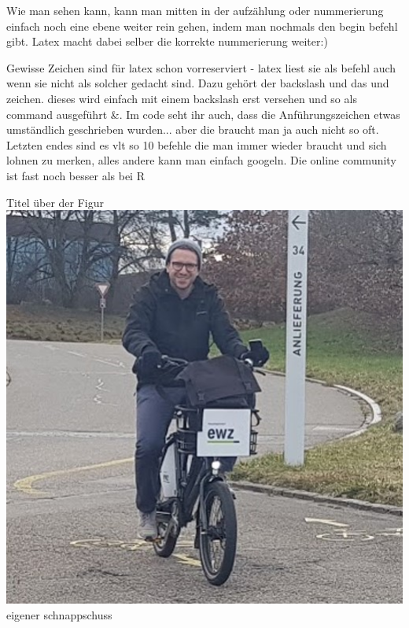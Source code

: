 Wie man sehen kann, kann man mitten in der aufzählung oder nummerierung einfach noch eine ebene weiter rein gehen, indem man nochmals den begin befehl gibt. Latex macht dabei selber die korrekte nummerierung weiter:)

Gewisse Zeichen sind für latex schon vorreserviert - latex liest sie als befehl auch wenn sie nicht als solcher gedacht sind. Dazu gehört der backslash und das \dq und\dq{} zeichen. dieses wird einfach mit einem backslash erst versehen und so als command ausgeführt \&. Im code seht ihr auch, dass die Anführungszeichen etwas umständlich geschrieben wurden... aber die braucht man ja auch nicht so oft. Letzten endes sind es vlt so 10 befehle die man immer wieder braucht und sich lohnen zu merken, alles andere kann man einfach googeln. Die online community ist fast noch besser als bei R


{Titel über der Figur}%
{\label{fig:michi}}%
{\includegraphics[width=1.0\textwidth, angle=0]{figures/Bild1.jpg}}%
{eigener schnappschuss} %

